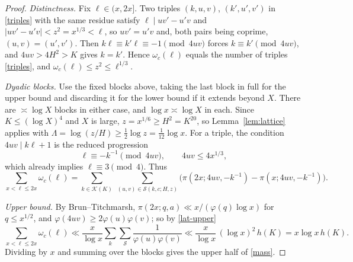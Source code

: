 \documentclass[11pt,reqno]{amsart}
\newcommand{\cS}{\mathcal S}
\newcommand{\cK}{\mathcal K}
\begin{document}
\begin{proof}
\emph{Distinctness.}  Fix $\ell\in(x,2x]$.  Two triples $(k,u,v)$, $(k',u',v')$
in \eqref{triples} with the same residue satisfy $\ell\mid uv'-u'v$ and
$|uv'-u'v|<z^2=x^{1/3}<\ell$, so $uv'=u'v$ and, both pairs being coprime,
$(u,v)=(u',v')$.  Then $k\ell\equiv k'\ell\equiv-1\pmod{4uv}$ forces
$k\equiv k'\pmod{4uv}$, and $4uv>4H^2>K$ gives $k=k'$.  Hence
$\omega_c(\ell)$ equals the number of triples \eqref{triples}, and
$\omega_c(\ell)\le z^2\le\ell^{1/3}$.

\emph{Dyadic blocks.}  Use the fixed blocks above, taking the last block
in full for the upper bound and discarding it for the lower bound if it
extends beyond $X$.  There are $\asymp\log X$ blocks in either case, and
$\log x\asymp\log X$ in each.  Since $K\le(\log X)^4$ and $X$ is large, $z=x^{1/6}\ge H^2=K^{20}$,
so Lemma~\ref{lem:lattice} applies with $\Lambda=\log(z/H)\ge\frac12\log z=\frac1{12}\log x$.
For a triple, the condition $4uv\mid k\ell+1$ is the reduced progression
\begin{equation}\label{prog}
 \ell\equiv-k^{-1}\pmod{4uv},\qquad 4uv\le4x^{1/3},
\end{equation}
which already implies $\ell\equiv3\pmod4$.  Thus
\begin{equation}\label{count}
 \sum_{x<\ell\le2x}\omega_c(\ell)=\sum_{k\in\cK(K)}\ \sum_{(u,v)\in\cS(k,c;H,z)}
 \big(\pi(2x;4uv,-k^{-1})-\pi(x;4uv,-k^{-1})\big).
\end{equation}

\emph{Upper bound.}  By Brun--Titchmarsh, $\pi(2x;q,a)\ll x/(\varphi(q)\log x)$
for $q\le x^{1/2}$, and $\varphi(4uv)\ge2\varphi(u)\varphi(v)$; so by
\eqref{lat-upper}
\[
 \sum_{x<\ell\le2x}\omega_c(\ell)\ll\frac{x}{\log x}\sum_{k}\sum_{\cS}\frac1{\varphi(u)\varphi(v)}
 \ll\frac x{\log x}\,(\log x)^2\,h(K)=x\log x\,h(K).
\]
Dividing by $x$ and summing over the blocks gives the upper half of \eqref{mass}.


\end{proof}
\end{document}

